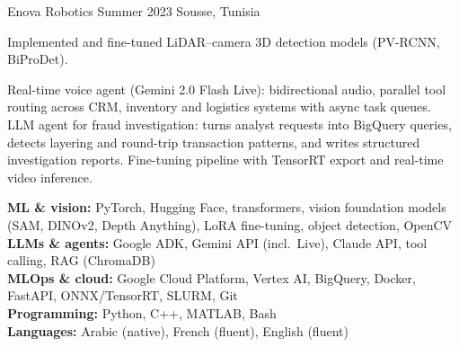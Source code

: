 %
        {Enova Robotics}%
        {Summer 2023}%
        {Sousse, Tunisia}
\begin{cvitems}
  \item Implemented and fine-tuned LiDAR--camera 3D detection models (PV-RCNN, BiProDet).
\end{cvitems}


%
  {Real-time voice agent (Gemini 2.0 Flash Live): bidirectional audio, parallel tool routing
   across CRM, inventory and logistics systems with async task queues.}
%
  {LLM agent for fraud investigation: turns analyst requests into BigQuery queries, detects
   layering and round-trip transaction patterns, and writes structured investigation reports.}
%
  {Fine-tuning pipeline with TensorRT export and real-time video inference.}

\CertificationBlock


\noindent
\textbf{ML \& vision:} PyTorch, Hugging Face, transformers, vision foundation models (SAM,
  DINOv2, Depth Anything), LoRA fine-tuning, object detection, OpenCV\\
\textbf{LLMs \& agents:} Google ADK, Gemini API (incl.\ Live), Claude API, tool calling, RAG
  (ChromaDB)\\
\textbf{MLOps \& cloud:} Google Cloud Platform, Vertex AI, BigQuery, Docker, FastAPI,
  ONNX/TensorRT, SLURM, Git\\
\textbf{Programming:} Python, C++, MATLAB, Bash\\
\textbf{Languages:} Arabic (native), French (fluent), English (fluent)

\PublicationsBlock
\EducationBlock


